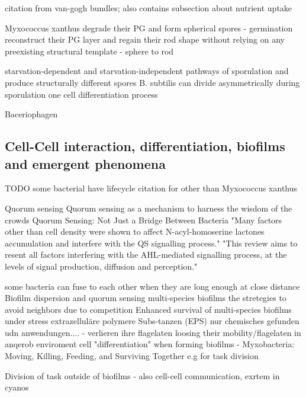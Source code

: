 \documentclass{article}
\begin{document}
\cite{Li2025} citation from van-gogh bundles; also contains subsection about nutrient uptake

Myxococcus xanthus degrade their PG and form spherical spores - germination reconstruct their PG layer and regain their rod shape without relying on any preexisting structural template - sphere to rod \cite{Huan2021}

starvation-dependent and starvation-independent pathways of sporulation and produce structurally different spores \cite{Licking2000}
B. subtilis can divide asymmetrically during sporulation one cell differentiation process \cite{Barák2019}

Baceriophagen \cite{Duckworth2002}

\subsection{Cell-Cell interaction, differentiation, biofilms and emergent phenomena} %

TODO some bacterial have lifecycle citation for other than Myxococcus xanthus 

Quorum sensing
\cite{MorenoGmez2023} Quorum sensing as a mechanism to harness the wisdom of the crowds
\cite{Liu2025} Quorum Sensing: Not Just a Bridge Between Bacteria
\cite{Boyer2009} "Many factors other than cell density were shown to affect N-acyl-homoserine lactones accumulation and interfere with the QS signalling process." "This review aims to resent all factors interfering with the AHL-mediated signalling process, at the levels of signal production, diffusion and perception."

some bacteria can fuse to each other when they are long enough at close distance \cite{Kudryashev2011}
Biofilm dispersion and quorum sensing \cite{Solano2014}
multi-species biofilms the stretegies to avoid neighbors due to competition \cite{Rendueles2012}
Enhanced survival of multi-species biofilms under stress \cite{Wisnu2022}
extrazelluläre polymere Subs-tanzen (EPS) nur chemisches gefunden udn anwendungen....
- verlieren ihre flagelaten loosing their mobility/flagelaten in anqerob enviroment
cell "differentiation" when forming biofilms - \cite{Lopez2010}
Myxobacteria: Moving, Killing, Feeding, and Surviving Together \cite{Jose2016} e.g for task division

Division of task outside of biofilms -  also cell-cell communication, exrtem in cyanos
\end{document}
